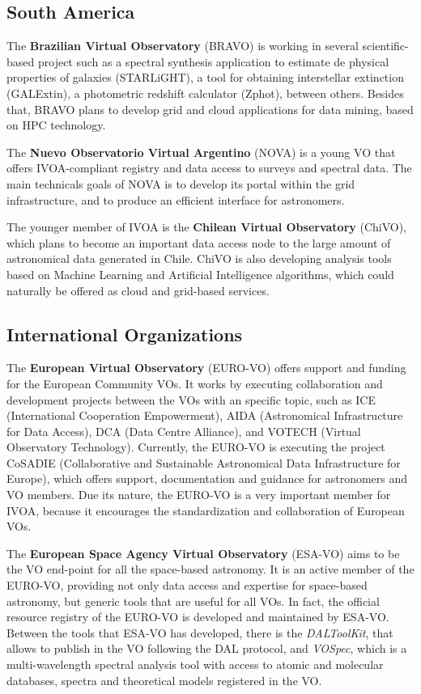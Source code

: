 \subsection{South America}

The \textbf{Brazilian Virtual Observatory} (BRAVO) is working in several
scientific-based project \cite{CarvalhoXXXX} such as a spectral synthesis 
application to
estimate de physical properties of galaxies (STARLiGHT), a tool 
for obtaining interstellar extinction (GALExtin), a photometric redshift
calculator (Zphot), between others. Besides that, BRAVO plans to develop
grid and cloud applications for data mining, based on HPC technology.

The \textbf{Nuevo Observatorio Virtual Argentino} (NOVA) is a young
VO that offers IVOA-compliant registry and data access to surveys and
spectral data. The main technicals goals of NOVA is to develop its portal
within the grid infrastructure, and to produce an efficient interface for
astronomers.

The younger member of IVOA is the \textbf{Chilean Virtual Observatory} (ChiVO),
which plans to become an important data access node to the large amount
of astronomical data generated in Chile. ChiVO is also developing analysis
tools based on Machine Learning and Artificial Intelligence algorithms,
which could naturally be offered as cloud and grid-based services.

\subsection{International Organizations}

The \textbf{European Virtual Observatory} (EURO-VO) offers support and funding
for the European Community VOs.  It works by executing collaboration and
development projects between the VOs with an specific topic, such as ICE
(International Cooperation Empowerment), %
AIDA (Astronomical Infrastructure for Data Access),%
DCA (Data Centre Alliance), and %
VOTECH (Virtual Observatory Technology). %
Currently, the EURO-VO is executing the project CoSADIE (Collaborative and
Sustainable Astronomical Data Infrastructure for Europe), which offers 
support, documentation and guidance for astronomers and VO members.
Due its nature, the EURO-VO is a very important member for IVOA, because
it encourages the standardization and collaboration of European VOs.

The \textbf{European Space Agency Virtual Observatory} (ESA-VO) aims to be the
VO end-point for all the space-based astronomy.  It is an active member of the
EURO-VO, providing not only data access and expertise for space-based astronomy,
but generic tools that are useful for all VOs. In fact, the official resource
registry of the EURO-VO is developed and maintained by ESA-VO. 
Between the tools that ESA-VO has developed, there is the \emph{DALToolKit},
that allows to publish in the VO following the DAL protocol, and \emph{VOSpec},
which is a multi-wavelength spectral analysis tool with access to atomic and
molecular databases, spectra and theoretical models registered in the VO.




